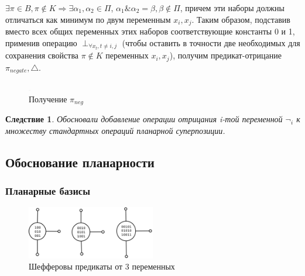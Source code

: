 \documentclass[12pt]{article}
\newtheorem{corollary}[theorem]{Следствие}
\newenvironment{proof}[1][Доказательство]{\begin{trivlist}
\item[\hskip \labelsep {\bfseries #1}]}{\end{trivlist}}
\begin{document}
\begin{proof}
$\exists \pi \in B, \pi \notin K \Rightarrow \exists \alpha_1, \alpha_2 \in \Pi$,
$\alpha_1\&\alpha_2=\beta, \beta \notin \Pi$, причем эти наборы должны отличаться как минимум по двум переменным $x_i, x_{j}$.
Таким образом, подставив вместо всех общих переменных этих наборов соответствующие константы 0 и 1, применив операцию 
$\perp_{\forall x_t, t \neq i,j}$
(чтобы оставить в точности две необходимых для сохранения свойства $\pi \notin K$ переменных $x_i, x_j$), 
получим предикат-отрицание $\pi_{negate}, \bigtriangleup$.
\begin{figure}[htb]
\centering
\includegraphics[width=0.01\textwidth]{3_2to3.png}
\caption{Получение $\pi_{neg}$}
\label{fig:negation}
\end{figure}

\end{proof}

\begin{corollary}
Обосновали добавление операции отрицания i-той переменной $\neg_i$ к множеству стандартных операций планарной суперпозиции.
\end{corollary}

\subsection{Обоснование планарности}
\subsubsection{Планарные базисы}

\begin{figure}[htb]
\centering
\includegraphics[width=0.5\textwidth]{scheff3.png}
\caption{Шефферовы предикаты от 3 переменных}
\label{fig:sheff}
\end{figure}
\end{document}
